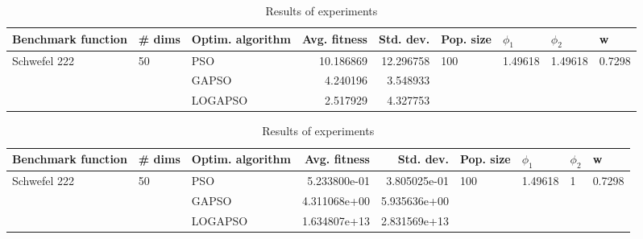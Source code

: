 \documentclass{article}
\begin{document}
\begin{table}
\centering
\caption{Results of experiments}
\begin{tabular}{lllrrllll}
\toprule
           Benchmark function &             \# dims & Optim. algorithm &  Avg. fitness &  Std. dev. &            Pop. size &               $\phi_{1}$ &               $\phi_{2}$ &                       w \\
\midrule
\multirow{3}{*}{Schwefel 222} & \multirow{3}{*}{50} &              PSO &     10.186869 &  12.296758 & \multirow{3}{*}{100} & \multirow{3}{*}{1.49618} & \multirow{3}{*}{1.49618} & \multirow{3}{*}{0.7298} \\
                              &                     &            GAPSO &      4.240196 &   3.548933 &                      &                          &                          &                         \\
                              &                     &          LOGAPSO &      2.517929 &   4.327753 &                      &                          &                          &                         \\
\bottomrule
\end{tabular}
\end{table}
\begin{table}
\centering
\caption{Results of experiments}
\begin{tabular}{lllrrllll}
\toprule
           Benchmark function &             \# dims & Optim. algorithm &  Avg. fitness &    Std. dev. &            Pop. size &               $\phi_{1}$ &         $\phi_{2}$ &                       w \\
\midrule
\multirow{3}{*}{Schwefel 222} & \multirow{3}{*}{50} &              PSO &  5.233800e-01 & 3.805025e-01 & \multirow{3}{*}{100} & \multirow{3}{*}{1.49618} & \multirow{3}{*}{1} & \multirow{3}{*}{0.7298} \\
                              &                     &            GAPSO &  4.311068e+00 & 5.935636e+00 &                      &                          &                    &                         \\
                              &                     &          LOGAPSO &  1.634807e+13 & 2.831569e+13 &                      &                          &                    &                         \\
\bottomrule
\end{tabular}
\end{table}
\end{document}
